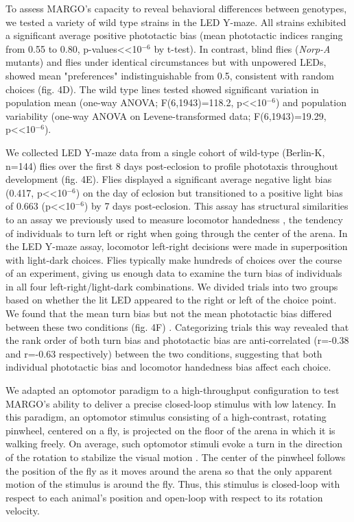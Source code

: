 \documentclass[10pt]{article}
\begin{document}
\begin{multicols}{2}
To assess MARGO's capacity to reveal behavioral differences between genotypes, we tested a variety of wild type strains in the LED Y-maze. All strains exhibited a significant average positive phototactic bias (mean phototactic indices ranging from 0.55 to 0.80, p-values<<10$^{-6}$ by t-test). In contrast, blind flies (\emph{Norp-A} mutants) and flies under identical circumstances but with unpowered LEDs, showed mean "preferences" indistinguishable from 0.5, consistent with random choices (fig. 4D). The wild type lines tested showed significant variation in population mean (one-way ANOVA; F(6,1943)=118.2, p<<10$^{-6}$) and population variability (one-way ANOVA on Levene-transformed data; F(6,1943)=19.29, p<<10$^{-6}$).

We collected LED Y-maze data from a single cohort of wild-type (Berlin-K, n=144) flies over the first 8 days post-eclosion to profile phototaxis throughout development (fig. 4E). Flies displayed a significant average negative light bias (0.417, p<<10$^{-6}$) on the day of eclosion but transitioned to a positive light bias of 0.663 (p<<10$^{-6}$) by 7 days post-eclosion. This assay has structural similarities to an assay we previously used to measure locomotor handedness \citep{Buchanan_Neuronal_2015}, the tendency of individuals to turn left or right when going through the center of the arena. In the LED Y-maze assay, locomotor left-right decisions were made in superposition with light-dark choices. Flies typically make hundreds of choices over the course of an experiment, giving us enough data to examine the turn bias of individuals in all four left-right/light-dark combinations. We divided trials into two groups based on whether the lit LED appeared to the right or left of the choice point. We found that the mean turn bias but not the mean phototactic bias differed between these two conditions (fig. 4F) \citep{Ayroles_Behavioral_2015}. Categorizing trials this way revealed that the rank order of both turn bias and phototactic bias are anti-correlated (r=-0.38 and r=-0.63 respectively) between the two conditions, suggesting that both individual phototactic bias and locomotor handedness bias affect each choice. 

We adapted an optomotor paradigm \citep{Cruz572792} to a high-throughput configuration to test MARGO's ability to deliver a precise closed-loop stimulus with low latency. In this paradigm, an optomotor stimulus consisting of a high-contrast, rotating pinwheel, centered on a fly, is projected on the floor of the arena in which it is walking freely. On average, such optomotor stimuli evoke a turn in the direction of the rotation to stabilize the visual motion \citep{Gtz_Visual_1973}. The center of the pinwheel follows the position of the fly as it moves around the arena so that the only apparent motion of the stimulus is around the fly. Thus, this stimulus is closed-loop with respect to each animal's position and open-loop with respect to its rotation velocity.


\end{multicols}
\end{document}
